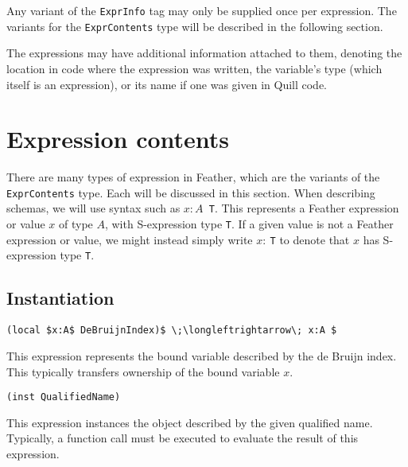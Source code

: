 \documentclass[11pt]{book}
\begin{document}

Any variant of the \lstinline{ExprInfo} tag may only be supplied once per expression.
The variants for the \lstinline{ExprContents} type will be described in the following section.

The expressions may have additional information attached to them, denoting the location in code where the expression was written, the variable's type (which itself is an expression), or its name if one was given in Quill code.

\section{Expression contents}

There are many types of expression in Feather, which are the variants of the \lstinline{ExprContents} type.
Each will be discussed in this section.
When describing schemas, we will use syntax such as \( x:A \)\lstinline! T!.
This represents a Feather expression or value \( x \) of type \( A \), with S-expression type \lstinline{T}.
If a given value is not a Feather expression or value, we might instead simply write \( x:\ \)\lstinline{T} to denote that \( x \) has S-expression type \lstinline{T}.


\subsection{Instantiation}
\begin{lstlisting}[mathescape=true]
(local $x:A$ DeBruijnIndex)$ \;\longleftrightarrow\; x:A $
\end{lstlisting}
This expression represents the bound variable described by the de Bruijn index.
This typically transfers ownership of the bound variable \( x \).
\begin{lstlisting}[mathescape=true]
(inst QualifiedName)
\end{lstlisting}
This expression instances the object described by the given qualified name.
Typically, a function call must be executed to evaluate the result of this expression.
\end{document}
